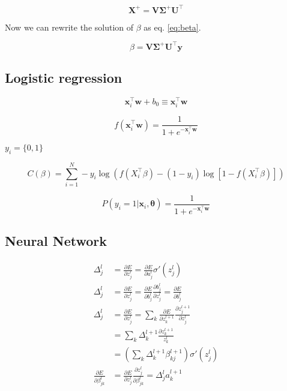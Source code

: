 \documentclass[a4paper,12pt, english]{article}
\begin{document}
\begin{equation} \label{pseudo}
\mathbf{X}^+ = \mathbf{V} \mathbf{\Sigma}^+ \mathbf{U}^\top 
\end{equation}

Now we can rewrite the solution of $\beta$ as eq. \ref{eq:beta}.

\begin{equation}
\beta = \mathbf{V} \mathbf{\Sigma}^+ \mathbf{U}^\top \mathbf{y}
\end{equation}

\subsection{Logistic regression}

\begin{equation}
\mathbf{x}_i^{\top} \mathbf{w} + b_0 \equiv \mathbf{x}_i^{\top} \mathbf{w} 
\end{equation}

\begin{equation}
f(\mathbf{x}_i^{\top} \mathbf{w}) = \frac{1}{1 + e^{-\mathbf{x}_i^{\top} \mathbf{w}}}
\end{equation}

$y_i = \{0,1\}$

\begin{equation}
C(\beta) = \sum_{i=1}^N -y_i \log (f(X_i^\top \beta) - (1 - y_i) \log [1 - f(X_i^\top \beta)])
\end{equation}

\begin{equation}
P(y_i = 1|\mathbf{x}_i,\mathbf{\theta}) = \frac{1}{1 + e^{-\mathbf{x}_i^{\top} \mathbf{w}}}
\end{equation}

\subsection{Neural Network}

\begin{align}
\Delta_j^l &= \frac{\partial E}{\partial z_j^l} = \frac{\partial E}{\partial a_j^l} \sigma'(z_j^l) \\
\Delta_j^l &= \frac{\partial E}{\partial z_j^l} = \frac{\partial E}{\partial b_j^l} \frac{\partial b_j^l}{\partial z_j^l} = \frac{\partial E}{\partial b_j^l} \\
\Delta_j^l &= \frac{\partial E}{\partial z_j^l} = \sum_k \frac{\partial E}{\partial z_k^{l+1}} \frac{\partial z_j^{l+1}}{\partial z_j^l} \\
&= \sum_k \Delta_k^{l+1} \frac{\partial z_k^{l+1}}{z_k^l} \\
&= \left( \sum_k \Delta_k^{l+1} \beta_{kj}^{l+1} \right) \sigma'(z_j^l) \\
\frac{\partial E}{\partial \beta_{jk}^l} &= \frac{\partial E}{\partial z_j^l} \frac{\partial z_j^l}{\partial \beta_{jk}^l} = \Delta_j^l a_k^{l+1} 
\end{align}
\end{document}

